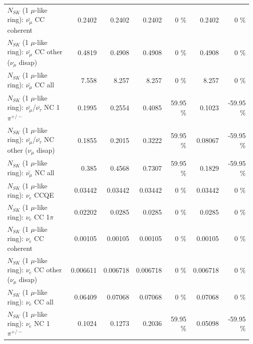 \begin{table}
\begin{tabular}{| l | r | r | r  r | r  r |}
                       $N_{SK}$ (1 $\mu$-like ring): $\bar{\nu_\mu}$ CC coherent &          0.2402 &          0.2402 &          0.2402 &        0 \%  &          0.2402 &        0 \%  \\ 
        $N_{SK}$ (1 $\mu$-like ring): $\bar{\nu_\mu}$ CC other ($\nu_\mu$ disap) &          0.4819 &          0.4908 &          0.4908 &        0 \%  &          0.4908 &        0 \%  \\ 
                          $N_{SK}$ (1 $\mu$-like ring): $\bar{\nu_{\mu}}$ CC all &           7.558 &           8.257 &           8.257 &        0 \%  &           8.257 &        0 \%  \\ 
\hline
  $N_{SK}$ (1 $\mu$-like ring): $\bar{\nu_\mu}$/$\bar{\nu_\tau}$ NC 1$\pi^{+/-}$ &          0.1995 &          0.2554 &          0.4085 &    59.95 \%  &          0.1023 &   -59.95 \%  \\ 
$N_{SK}$ (1 $\mu$-like ring): $\bar{\nu_\mu}$/$\bar{\nu_\tau}$ NC other ($\nu_\mu$ disap) &          0.1855 &          0.2015 &          0.3222 &    59.95 \%  &         0.08067 &   -59.95 \%  \\ 
                          $N_{SK}$ (1 $\mu$-like ring): $\bar{\nu_{\mu}}$ NC all &           0.385 &          0.4568 &          0.7307 &    59.95 \%  &          0.1829 &   -59.95 \%  \\ 
\hline
\hline
\hline
                                      $N_{SK}$ (1 $\mu$-like ring): $\nu_e$ CCQE &         0.03442 &         0.03442 &         0.03442 &        0 \%  &         0.03442 &        0 \%  \\ 
                                 $N_{SK}$ (1 $\mu$-like ring): $\nu_e$ CC 1$\pi$ &         0.02202 &          0.0285 &          0.0285 &        0 \%  &          0.0285 &        0 \%  \\ 
                               $N_{SK}$ (1 $\mu$-like ring): $\nu_e$ CC coherent &         0.00105 &         0.00105 &         0.00105 &        0 \%  &         0.00105 &        0 \%  \\ 
                $N_{SK}$ (1 $\mu$-like ring): $\nu_e$ CC other ($\nu_\mu$ disap) &        0.006611 &        0.006718 &        0.006718 &        0 \%  &        0.006718 &        0 \%  \\ 
                                  $N_{SK}$ (1 $\mu$-like ring): $\nu_{e}$ CC all &         0.06409 &         0.07068 &         0.07068 &        0 \%  &         0.07068 &        0 \%  \\ 
\hline
                           $N_{SK}$ (1 $\mu$-like ring): $\nu_e$ NC 1$\pi^{+/-}$ &          0.1024 &          0.1273 &          0.2036 &    59.95 \%  &         0.05098 &   -59.95 \%  \\ 

\end{tabular}
\end{table}
